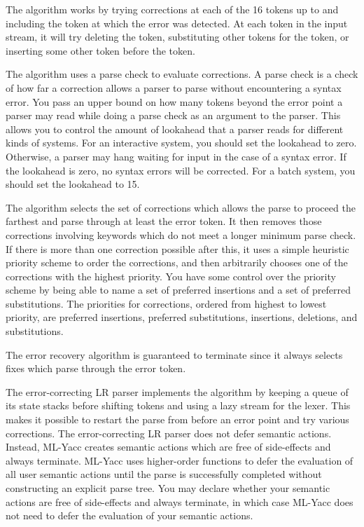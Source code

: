 The algorithm works by trying corrections at each
of the 16 tokens up to and including the token at which the
error was detected.  At each token in the input stream, it
will try deleting the token, substituting other tokens for the
token, or inserting some other token before the token.

The algorithm uses a parse check to evaluate corrections.  A parse
check is a check of how far a correction allows a parser to
parse without encountering a syntax error.
You pass an upper bound on how many tokens beyond the error
point a parser may read while doing a parse check as an argument to the
parser.  This allows
you to control the amount of lookahead that a parser reads
for different kinds of systems.  For an interactive system, you
should set the lookahead to zero.  Otherwise, a parser may hang
waiting for input in the case of a syntax error.  If the lookahead
is zero, no syntax errors will be corrected.  For a batch system,
you should set the lookahead to 15.

The algorithm selects the set of corrections which allows the parse
to proceed the farthest
and parse through at least the error token.  It then removes those
corrections involving keywords which do not meet a longer minimum
parse check.  If there is more than one correction possible after this,
it uses a simple heuristic priority scheme to order the corrections,
and then arbitrarily chooses one of the corrections with the highest priority.
You have some control over the priority scheme by being able to
name a set of preferred insertions and a set of preferred substitutions.
The priorities for corrections, ordered from highest to lowest
priority, are
preferred insertions, preferred substitutions, insertions, deletions,
and substitutions.

The error recovery algorithm is guaranteed to terminate since it always
selects fixes which parse through the
error token.

The error-correcting LR parser implements the algorithm by keeping
a queue of its state stacks before shifting tokens and using
a lazy stream for the lexer.
This makes it possible to restart the
parse from before an error point and try various corrections.  The
error-correcting LR parser does not defer semantic actions.  Instead,
ML-Yacc creates semantic actions which are free of side-effects
and always terminate.
ML-Yacc uses higher-order functions to defer the
evaluation of all user semantic actions until the parse is successfully
completed without constructing an explicit parse tree.
You may declare whether your semantic actions are free of side-effects
and always terminate, in which case ML-Yacc does not need to defer
the evaluation of your semantic actions.

